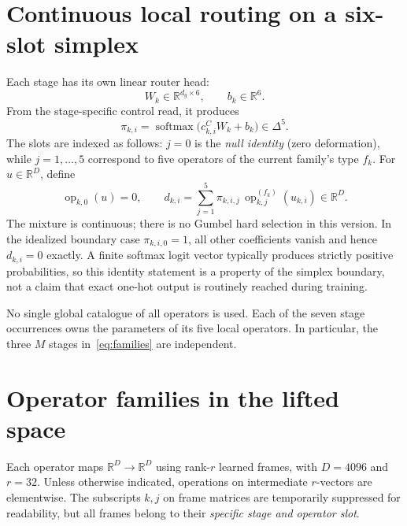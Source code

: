 \documentclass[11pt,a4paper]{article}
\newcommand{\R}{\mathbb{R}}
\newcommand{\softmax}{\operatorname{softmax}}
\newcommand{\op}{\operatorname{op}}
\begin{document}
\section{Continuous local routing on a six-slot simplex}

Each stage has its own linear router head:
\begin{equation}
W_k\in\R^{d_g\times 6},\qquad b_k\in\R^{6}.
\end{equation}
From the stage-specific control read, it produces
\begin{equation}\label{eq:router}
\pi_{k,i}=\softmax\bigl(c_{k,i}^CW_k+b_k\bigr)\in\Delta^{5}.
\end{equation}
The slots are indexed as follows: $j=0$ is the \emph{null identity} (zero deformation), while
$j=1,\dots,5$ correspond to five operators of the current family's type $f_k$. For $u\in\R^D$, define
\begin{equation}
\op_{k,0}(u)=0,\qquad d_{k,i}=\sum_{j=1}^{5}\pi_{k,i,j}\,\op_{k,j}^{(f_k)}(u_{k,i})\in\R^{D}.
\end{equation}
The mixture is continuous; there is no Gumbel hard selection in this version. In the idealized boundary
case $\pi_{k,i,0}=1$, all other coefficients vanish and hence $d_{k,i}=0$ exactly. A finite softmax logit
vector typically produces strictly positive probabilities, so this identity statement is a property of
the simplex boundary, not a claim that exact one-hot output is routinely reached during training.

No single global catalogue of all operators is used. Each of the seven stage occurrences owns the
parameters of its five local operators. In particular, the three $M$ stages in~\eqref{eq:families} are
independent.

\section{Operator families in the lifted space}

Each operator maps $\R^D\to\R^D$ using rank-$r$ learned frames, with $D=4096$ and $r=32$. Unless
otherwise indicated, operations on intermediate $r$-vectors are elementwise. The subscripts $k,j$ on frame
matrices are temporarily suppressed for readability, but all frames belong to their \emph{specific stage
and operator slot}.
\end{document}
